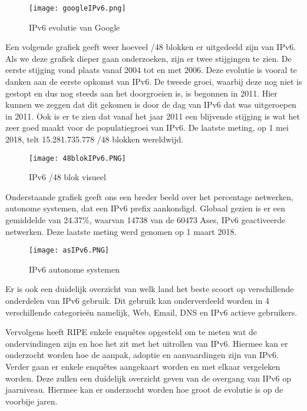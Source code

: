 \begin{figure}
\centering
\texttt{[image: googleIPv6.png]}
\caption{IPv6 evolutie van Google \autocite{GoogleIPv6}}
\end{figure}

Een volgende grafiek geeft weer hoeveel /48 blokken er uitgedeeld zijn van IPv6. Als we deze grafiek dieper gaan onderzoeken, zijn er twee stijgingen te zien. De eerste stijging vond plaats vanaf 2004 tot en met 2006. Deze evolutie is vooral te danken aan de eerste opkomst van IPv6. De tweede groei, waarbij deze nog niet is gestopt en dus nog steeds aan het doorgroeien is, is begonnen in 2011. Hier kunnen we zeggen dat dit gekomen is door de dag van IPv6 dat was uitgeroepen in 2011. Ook is er te zien dat vanaf het jaar 2011 een blijvende stijging is wat het zeer goed maakt voor de populatiegroei van IPv6. De laatste meting, op 1 mei 2018, telt 15.281.735.778 /48 blokken wereldwijd. 

\begin{figure}
\centering
\texttt{[image: 48blokIPv6.PNG]}
\caption{IPv6 /48 blok visueel \autocite{RIR2018}}
\end{figure}

Onderstaande grafiek geeft ons een breder beeld over het percentage netwerken, autonome systemen, dat een IPv6 prefix aankondigd. Globaal gezien is er een gemiddelde van 24.37\%, waarvan 14738 van de 60473 Ases, IPv6 geactiveerde netwerken. Deze laatste meting werd genomen op 1 maart 2018.

\begin{figure}
\centering
\texttt{[image: asIPv6.PNG]}
\caption{IPv6 autonome systemen \autocite{RIPE2016}}
\end{figure}

Er is ook een duidelijk overzicht van welk land het beste scoort op verschillende onderdelen van IPv6 gebruik. Dit gebruik kan onderverdeeld worden in 4 verschillende categorieën namelijk, Web, Email, DNS en IPv6 actieve gebruikers.

Vervolgens heeft RIPE enkele enquêtes opgesteld om te meten wat de ondervindingen zijn en hoe het zit met het uitrollen van IPv6. Hiermee kan er onderzocht worden hoe de aanpak, adoptie en aanvaardingen zijn van IPv6. Verder gaan er enkele enquêtes aangekaart worden en met elkaar vergeleken worden. Deze zullen een duidelijk overzicht geven van de overgang van IPv6 op jaarniveau. Hiermee kan er onderzocht worden hoe groot de evolutie is op de voorbije jaren.

